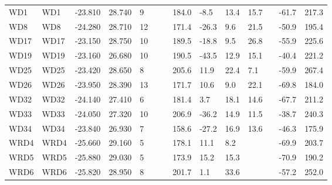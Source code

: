 \documentclass[11pt,letterpaper]{article}
\begin{document}
\begin{table}[!ht]
\begin{adjustwidth}{-0.0in}{0in}
\begin{tiny}
\begin{tabular}{p{2.0 cm}p{1.25 cm}llllllllllll}
WD1                      &                                  WD1 &   -23.810 &     28.740 &    9 &     &    &   184.0 &    -8.5 &  13.4 &   15.7 &      &     -61.7 &      217.3 \\
WD8                      &                                  WD8 &   -24.280 &     28.710 &   12 &     &    &   171.4 &   -26.3 &   9.6 &   21.5 &      &     -50.9 &      195.4 \\
WD17                     &                                 WD17 &   -23.150 &     28.750 &   10 &     &    &   189.5 &   -18.8 &   9.5 &   26.8 &      &     -55.9 &      225.6 \\
WD19                     &                                 WD19 &   -23.160 &     26.680 &   10 &     &    &   190.5 &   -43.5 &  12.9 &   15.1 &      &     -40.4 &      221.2 \\
WD25                     &                                 WD25 &   -23.420 &     28.650 &    8 &     &    &   205.6 &    11.9 &  22.4 &    7.1 &      &     -59.9 &      267.4 \\
WD26                     &                                 WD26 &   -23.950 &     28.390 &   13 &     &    &   171.7 &    10.6 &   9.0 &   22.1 &      &     -69.8 &      184.0 \\
WD32                     &                                 WD32 &   -24.140 &     27.410 &    6 &     &    &   181.4 &     3.7 &  18.1 &   14.6 &      &     -67.7 &      211.2 \\
WD33                     &                                 WD33 &   -24.050 &     27.320 &   10 &     &    &   206.9 &   -36.2 &  14.9 &   11.5 &      &     -38.7 &      240.3 \\
WD34                     &                                 WD34 &   -23.840 &     26.930 &    7 &     &    &   158.6 &   -27.2 &  16.9 &   13.6 &      &     -46.3 &      175.9 \\
WRD4                     &                                 WRD4 &   -25.660 &     29.160 &    5 &     &    &   178.1 &    11.1 &   8.2 &     &      &     -69.9 &      203.7 \\
WRD5                     &                                 WRD5 &   -25.880 &     29.030 &    5 &     &    &   173.9 &    15.2 &  15.3 &     &      &     -70.9 &      190.2 \\
WRD6                     &                                 WRD6 &   -25.820 &     28.950 &    8 &     &    &   201.7 &     1.1 &  33.6 &     &      &     -57.2 &      252.0 \\

\end{tabular}
\end{tiny}
\end{adjustwidth}
\end{table}
\end{document}
